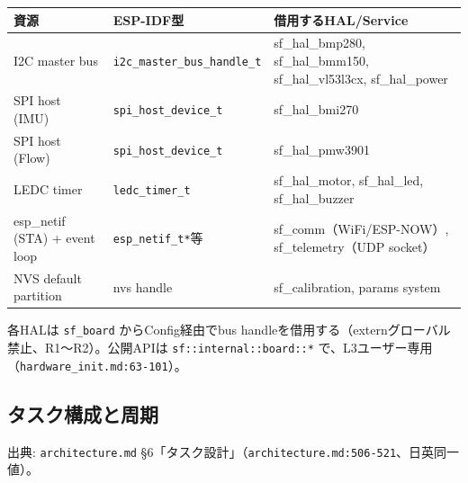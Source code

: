 \documentclass[a4paper,10pt]{ltjsarticle}
\begin{document}
\begin{table}[h]
\centering\footnotesize
\begin{tabularx}{\textwidth}{@{}llY@{}}
\toprule
資源 & ESP-IDF型 & 借用するHAL/Service \\
\midrule
I2C master bus & \texttt{i2c\_master\_bus\_handle\_t} & sf\_hal\_bmp280, sf\_hal\_bmm150, sf\_hal\_vl53l3cx, sf\_hal\_power \\
SPI host (IMU) & \texttt{spi\_host\_device\_t} & sf\_hal\_bmi270 \\
SPI host (Flow) & \texttt{spi\_host\_device\_t} & sf\_hal\_pmw3901 \\
LEDC timer & \texttt{ledc\_timer\_t} & sf\_hal\_motor, sf\_hal\_led, sf\_hal\_buzzer \\
esp\_netif (STA) + event loop & \texttt{esp\_netif\_t*}等 & sf\_comm（WiFi/ESP-NOW）, sf\_telemetry（UDP socket） \\
NVS default partition & nvs handle & sf\_calibration, params system \\
\bottomrule
\end{tabularx}
\end{table}

各HALは \texttt{sf\_board} からConfig経由でbus handleを借用する（externグローバル禁止、R1〜R2）。公開APIは \texttt{sf::internal::board::*} で、L3ユーザー専用（\texttt{hardware\_init.md:63-101}）。

\subsection{タスク構成と周期}

出典: \texttt{architecture.md} §6「タスク設計」（\texttt{architecture.md:506-521}、日英同一値）。
\end{document}
